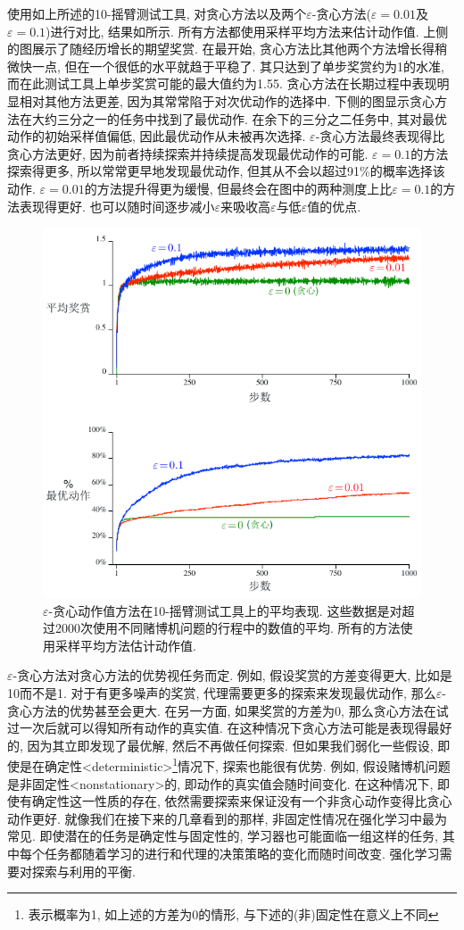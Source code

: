 使用如上所述的10-摇臂测试工具, 对贪心方法以及两个$\varepsilon$-贪心方法($\varepsilon = 0.01$及$\varepsilon = 0.1$)进行对比, 结果如所示. 所有方法都使用采样平均方法来估计动作值. 上侧的图展示了随经历增长的期望奖赏. 在最开始, 贪心方法比其他两个方法增长得稍微快一点, 但在一个很低的水平就趋于平稳了. 其只达到了单步奖赏约为1的水准, 而在此测试工具上单步奖赏可能的最大值约为1.55. 贪心方法在长期过程中表现明显相对其他方法更差, 因为其常常陷于对次优动作的选择中. 下侧的图显示贪心方法在大约三分之一的任务中找到了最优动作. 在余下的三分之二任务中, 其对最优动作的初始采样值偏低, 因此最优动作从未被再次选择. $\varepsilon$-贪心方法最终表现得比贪心方法更好, 因为前者持续探索并持续提高发现最优动作的可能. $\varepsilon = 0.1$的方法探索得更多, 所以常常更早地发现最优动作, 但其从不会以超过91\%的概率选择该动作. $\varepsilon = 0.01$的方法提升得更为缓慢, 但最终会在图中的两种测度上比$\varepsilon = 0.1$的方法表现得更好. 也可以随时间逐步减小$\varepsilon$来吸收高$\varepsilon$与低$\varepsilon$值的优点.

\begin{figure}[ht]
\centering
\includegraphics[width=.7\textwidth]{c2/img/figure2-2.pdf}
\caption{$\varepsilon$-贪心动作值方法在10-摇臂测试工具上的平均表现. 这些数据是对超过2000次使用不同赌博机问题的行程中的数值的平均. 所有的方法使用采样平均方法估计动作值.}\label{fig:2.2}
\end{figure}

$\varepsilon$-贪心方法对贪心方法的优势视任务而定. 例如, 假设奖赏的方差变得更大, 比如是10而不是1. 对于有更多噪声的奖赏, 代理需要更多的探索来发现最优动作, 那么$\varepsilon$-贪心方法的优势甚至会更大. 在另一方面, 如果奖赏的方差为0, 那么贪心方法在试过一次后就可以得知所有动作的真实值. 在这种情况下贪心方法可能是表现得最好的, 因为其立即发现了最优解, 然后不再做任何探索. 但如果我们弱化一些假设, 即使是在确定性<deterministic>\footnote{表示概率为1, 如上述的方差为0的情形, 与下述的(非)固定性在意义上不同}情况下, 探索也能很有优势. 例如, 假设赌博机问题是非固定性<nonstationary>的, 即动作的真实值会随时间变化. 在这种情况下, 即使有确定性这一性质的存在, 依然需要探索来保证没有一个非贪心动作变得比贪心动作更好. 就像我们在接下来的几章看到的那样, 非固定性情况在强化学习中最为常见. 即使潜在的任务是确定性与固定性的, 学习器也可能面临一组这样的任务, 其中每个任务都随着学习的进行和代理的决策策略的变化而随时间改变. 强化学习需要对探索与利用的平衡.


